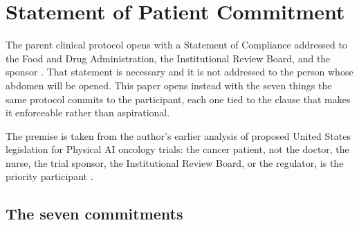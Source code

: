 \section{Statement of Patient Commitment}

The parent clinical protocol opens with a Statement of Compliance addressed to
the Food and Drug Administration, the Institutional Review Board, and the
sponsor \cite{onpremwhippl}. That statement is necessary and it is not
addressed to the person whose abdomen will be opened. This paper opens instead
with the seven things the same protocol commits to the participant, each one
tied to the clause that makes it enforceable rather than aspirational.

The premise is taken from the author's earlier analysis of proposed United
States legislation for Physical AI oncology trials: the cancer patient, not the
doctor, the nurse, the trial sponsor, the Institutional Review Board, or the
regulator, is the priority participant \cite{paibillprior, hr9510billv5}.


\subsection{The seven commitments}


\vspace{0.30em}

